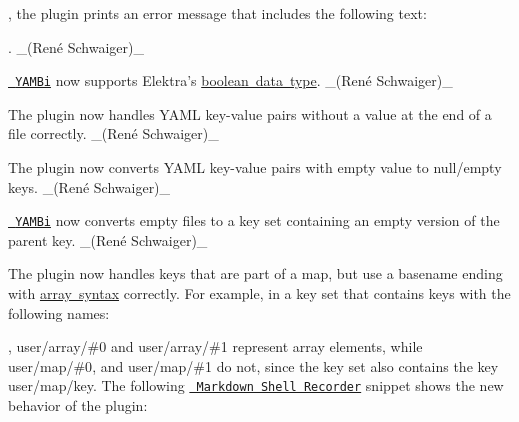 , the plugin prints an error message that includes the following text\+:


\begin{DoxyCode}{0}
\DoxyCodeLine{                  \string^}
\DoxyCodeLine{                        \string^}
\end{DoxyCode}


. \+\_\+(René Schwaiger)\+\_\+


\begin{DoxyItemize}
\item \href{https://www.libelektra.org/plugins/yambi}{\texttt{ Y\+A\+M\+Bi}} now supports Elektra’s \mbox{\hyperlink{doc_decisions_boolean_md}{boolean data type}}. \+\_\+(René Schwaiger)\+\_\+
\item The plugin now handles Y\+A\+ML key-\/value pairs without a value at the end of a file correctly. \+\_\+(René Schwaiger)\+\_\+
\item The plugin now converts Y\+A\+ML key-\/value pairs with empty value to null/empty keys. \+\_\+(René Schwaiger)\+\_\+
\item \href{https://www.libelektra.org/plugins/yambi}{\texttt{ Y\+A\+M\+Bi}} now converts empty files to a key set containing an empty version of the parent key. \+\_\+(René Schwaiger)\+\_\+
\end{DoxyItemize}


\begin{DoxyItemize}
\item The plugin now handles keys that are part of a map, but use a basename ending with \mbox{\hyperlink{doc_tutorials_arrays_md}{array syntax}} correctly. For example, in a key set that contains keys with the following names\+:
\end{DoxyItemize}


\begin{DoxyCode}{0}
\end{DoxyCode}


, {\ttfamily user/array/\#0} and {\ttfamily user/array/\#1} represent array elements, while {\ttfamily user/map/\#0}, and {\ttfamily user/map/\#1} do not, since the key set also contains the key {\ttfamily user/map/key}. The following \href{https://master.libelektra.org/tests/shell/shell_recorder/tutorial_wrapper}{\texttt{ Markdown Shell Recorder}} snippet shows the new behavior of the plugin\+:


